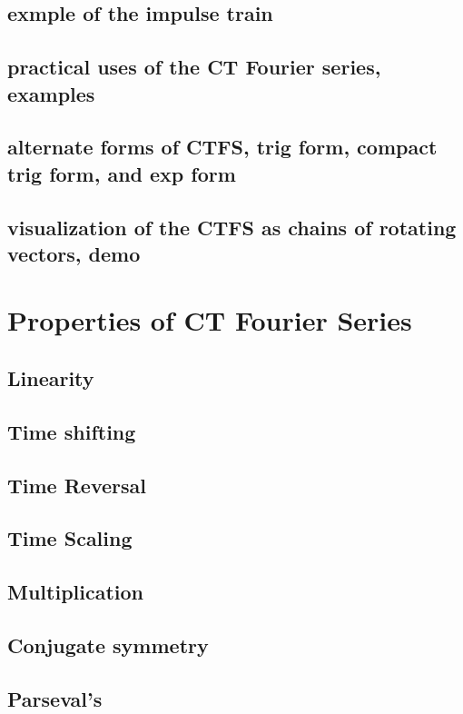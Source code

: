 \documentclass{article}
\begin{document}
\subsection{exmple of the impulse train}
\label{sec:org01d1aa2}
\subsection{practical uses of the CT Fourier series, examples}
\label{sec:org9bb1861}
\subsection{alternate forms of CTFS, trig form, compact trig form, and exp form}
\label{sec:org1f25d25}
\subsection{visualization of the CTFS as chains of rotating vectors, demo}
\label{sec:org969c81d}

\newpage
\section{Properties of CT Fourier Series}
\label{sec:org1620a4a}
\subsection{Linearity}
\label{sec:org85da9b6}
\subsection{Time shifting}
\label{sec:org39878bc}
\subsection{Time Reversal}
\label{sec:org60b9699}
\subsection{Time Scaling}
\label{sec:org69c6034}
\subsection{Multiplication}
\label{sec:orgea601f0}
\subsection{Conjugate symmetry}
\label{sec:org2c7c125}
\subsection{Parseval's}
\label{sec:orgdaf814a}
\end{document}
